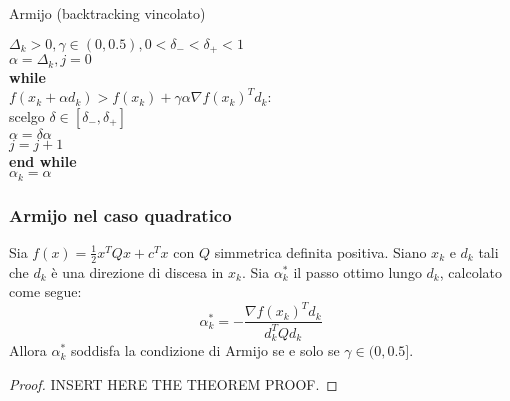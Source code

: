 \begin{algorithm}
	\label{alg:methods.armijo.backtracking.bounded}
	\caption{Armijo (backtracking vincolato)}
	$\Delta_{k}>0, \gamma\in(0,0.5),0<\delta_{-}<\delta_{+}<1$ \\
	$\alpha=\Delta_{k}, j=0$ \\
	\textbf{while} \\
	$f(x_{k}+\alpha d_{k}) > f(x_{k})+\gamma\alpha\nabla f(x_{k})^{T}d_{k}$: \\
	scelgo $\delta\in[\delta_{-},\delta_{+}]$ \\
	$\alpha=\delta\alpha$ \\
	$j=j+1$ \\
	\textbf{end while} \\
	$\alpha_{k}=\alpha$
\end{algorithm}


\subsubsection{Armijo nel caso quadratico}
\label{sec:methods.armijo.quadratic}

\begin{theorem}
	\label{thm:methods.armijo.quadratic}
	Sia $f(x)=\frac{1}{2}x^{T}Qx+c^{T}x$ con $Q$ simmetrica definita positiva.
	Siano $x_{k}$ e $d_{k}$ tali che $d_{k}$ è una direzione di discesa in $x_{k}$.
	Sia $\alpha_{k}^{*}$ il passo ottimo lungo $d_{k}$, calcolato come segue:
	\begin{equation}
	\alpha_{k}^{*}=-\frac{\nabla f(x_{k})^{T}d_{k}}{d_{k}^{T}Qd_{k}}
	\end{equation}
	Allora $\alpha_{k}^{*}$ soddisfa la condizione di Armijo se e solo se
	$\gamma\in(0,0.5]$.

	\begin{proof}
		INSERT HERE THE THEOREM PROOF.
	\end{proof}
\end{theorem}

